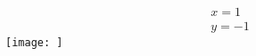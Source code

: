 \documentclass{article}
\begin{document}
\begin{gather}
	x = 1 \\
	y = -1
\end{gather}
\texttt{[image: ]}
\end{document}

